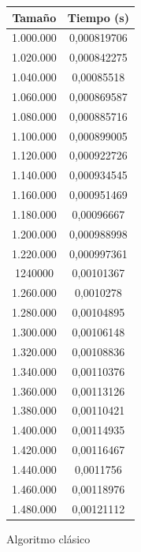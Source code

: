 \documentclass[12pt,spanish]{article}
\begin{document}
\begin{figure}[H]
\begin{tabular}{|c|c|}
\hline
\textbf{Tamaño} & \textbf{Tiempo (s)} \\
\hline
1.000.000 & 0,000819706\\
\hline
1.020.000 & 0,000842275\\
\hline
1.040.000 & 0,00085518\\
\hline
1.060.000 & 0,000869587\\
\hline
1.080.000 & 0,000885716\\
\hline
1.100.000 & 0,000899005\\
\hline
1.120.000 & 0,000922726\\
\hline
1.140.000 & 0,000934545\\
\hline
1.160.000 & 0,000951469\\
\hline
1.180.000 & 0,00096667\\
\hline
1.200.000 & 0,000988998\\
\hline
1.220.000 & 0,000997361\\
\hline
1240000 & 0,00101367\\
\hline
1.260.000 & 0,0010278\\
\hline
1.280.000 & 0,00104895\\
\hline
1.300.000 & 0,00106148\\
\hline
1.320.000 & 0,00108836\\
\hline
1.340.000 & 0,00110376\\
\hline
1.360.000 & 0,00113126\\
\hline
1.380.000 & 0,00110421\\
\hline
1.400.000 & 0,00114935\\
\hline
1.420.000 & 0,00116467\\
\hline
1.440.000 & 0,0011756\\
\hline
1.460.000 & 0,00118976\\
\hline
1.480.000 & 0,00121112\\
\hline

\end{tabular}


\caption{Algoritmo clásico}
\end{figure}
\end{document}
